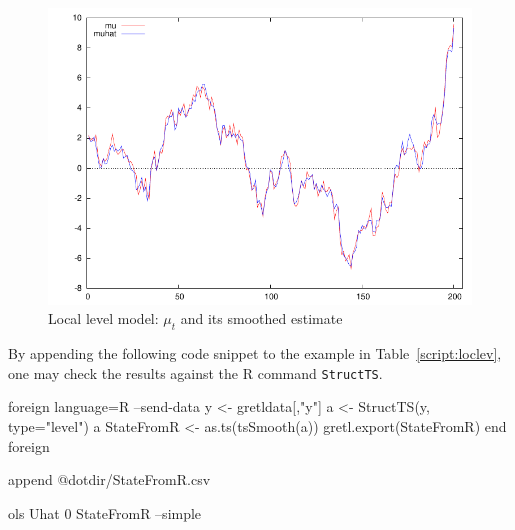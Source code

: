 \begin{figure}[htbp]
  \centering
  \includegraphics{figures/local_level}
  \caption{Local level model: $\mu_t$ and its smoothed estimate}
  \label{fig:loclev}
\end{figure}
By appending the following code snippet to the example in
Table~\ref{script:loclev}, one may check the results against the
\textsf{R} command \texttt{StructTS}.

\begin{code}
foreign language=R --send-data
  y <- gretldata[,"y"]
  a <- StructTS(y, type="level")
  a
  StateFromR <- as.ts(tsSmooth(a))
  gretl.export(StateFromR)
end foreign

append @dotdir/StateFromR.csv

ols Uhat 0 StateFromR --simple
\end{code}



